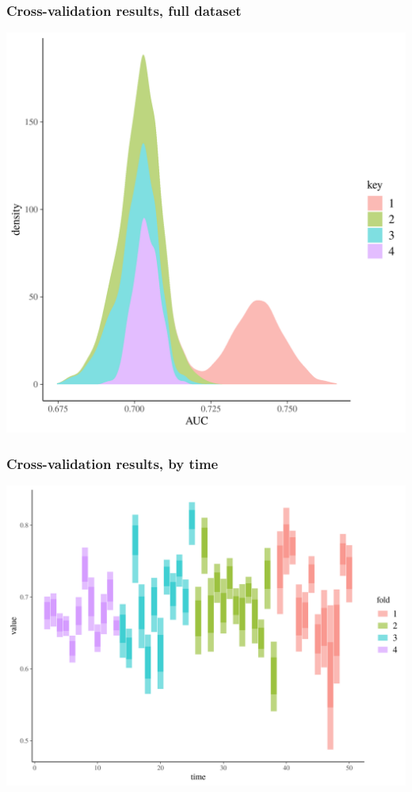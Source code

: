 \documentclass{beamer}
\begin{document}
\begin{frame}
  \frametitle{Cross-validation results, full dataset}

  \includegraphics[width=\textwidth,height=0.8\textheight,keepaspectratio=true]{../results/figure/fold_auc}

\end{frame}


\begin{frame}
  \frametitle{Cross-validation results, by time}

  \includegraphics[width=\textwidth,height=0.8\textheight,keepaspectratio=true]{../results/figure/fold_auc_time}

\end{frame}
\end{document}
